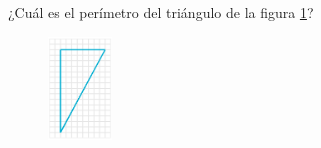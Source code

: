 ¿Cuál es el perímetro del triángulo de la figura \ref{fig:peri_rect_03}?
\begin{figure}[H]
    \centering
    \includegraphics[width=0.15\textwidth]{../images/peri_rect_03.png}
    \caption{}
    \label{fig:peri_rect_03}
\end{figure}
\begin{solutionbox}{14cm}

\end{solutionbox}
